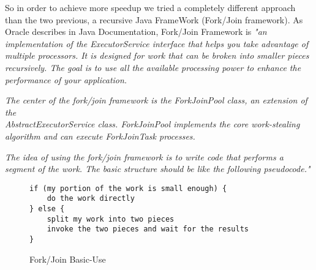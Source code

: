 \documentclass{dithesis}
\begin{document}
        So in order to achieve more speedup we tried a completely different approach than the two previous, a recursive Java FrameWork (Fork/Join framework). As Oracle describes in Java Documentation, Fork/Join Framework is
    	\textit{"an implementation of the ExecutorService interface that helps you take advantage of multiple processors. It is designed for work that can be broken into smaller pieces recursively. The goal is to use all the available processing power to enhance the performance of your application.}

		\textit{The center of the fork/join framework is the ForkJoinPool class, an extension of the \\ AbstractExecutorService class. ForkJoinPool implements the core work-stealing algorithm and can execute ForkJoinTask processes.}

    \textit{The idea of using the fork/join framework is to write code that performs a segment of the work. The basic structure should be like the following pseudocode."} \cite{Oracle Java Fork/Join Framework}

        \begin{figure}[H]
\begin{lstlisting}
if (my portion of the work is small enough) {
    do the work directly
} else {
    split my work into two pieces
    invoke the two pieces and wait for the results
}
\end{lstlisting}
        \caption{Fork/Join Basic-Use}
        \end{figure}
\end{document}
